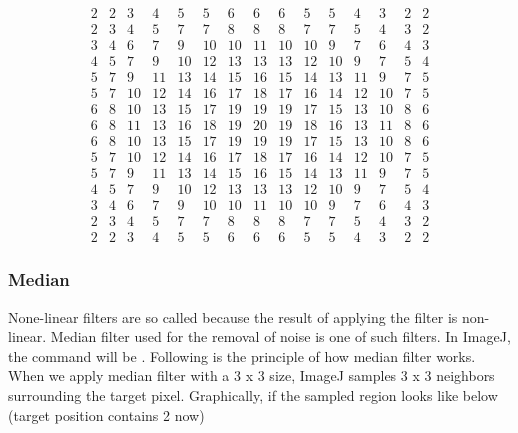 \setcounter{MaxMatrixCols}{16}
\[
\begin{matrix}
  2 & 2 & 3 & 4 & 5 & 5 & 6 & 6 & 6 & 5 & 5 & 4 & 3 & 2 & 2\\
  2 & 3 & 4 & 5 & 7 & 7 & 8 & 8 & 8 & 7 & 7 & 5 & 4 & 3 & 2\\
  3 & 4 & 6 & 7 & 9 & 10 & 10 & 11 & 10 & 10 & 9 & 7 & 6 & 4 & 3\\
  4 & 5 & 7 & 9 & 10 & 12 & 13 & 13 & 13 & 12 & 10 & 9 & 7 & 5 & 4\\
  5 & 7 & 9 & 11 & 13 & 14 & 15 & 16 & 15 & 14 & 13 & 11 & 9 & 7 & 5\\
  5 & 7 & 10 & 12 & 14 & 16 & 17 & 18 & 17 & 16 & 14 & 12 & 10 & 7 & 5\\
  6 & 8 & 10 & 13 & 15 & 17 & 19 & 19 & 19 & 17 & 15 & 13 & 10 & 8 & 6\\
  6 & 8 & 11 & 13 & 16 & 18 & 19 & 20 & 19 & 18 & 16 & 13 & 11 & 8 & 6\\
  6 & 8 & 10 & 13 & 15 & 17 & 19 & 19 & 19 & 17 & 15 & 13 & 10 & 8 & 6\\
  5 & 7 & 10 & 12 & 14 & 16 & 17 & 18 & 17 & 16 & 14 & 12 & 10 & 7 & 5\\
  5 & 7 & 9 & 11 & 13 & 14 & 15 & 16 & 15 & 14 & 13 & 11 & 9 & 7 & 5\\
  4 & 5 & 7 & 9 & 10 & 12 & 13 & 13 & 13 & 12 & 10 & 9 & 7 & 5 & 4\\
  3 & 4 & 6 & 7 & 9 & 10 & 10 & 11 & 10 & 10 & 9 & 7 & 6 & 4 & 3\\
  2 & 3 & 4 & 5 & 7 & 7 & 8 & 8 & 8 & 7 & 7 & 5 & 4 & 3 & 2\\
  2 & 2 & 3 & 4 & 5 & 5 & 6 & 6 & 6 & 5 & 5 & 4 & 3 & 2 & 2
 \end{matrix}
\]
\setcounter{MaxMatrixCols}{10}

\subsubsection{Median}
None-linear filters are so called because the result of applying the
filter is non-linear. Median filter used for the removal of noise is
one of such filters. In ImageJ, the command will be . Following is the
principle of how median filter works. When we apply median filter with
a 3 x 3 size, ImageJ samples 3 x 3 neighbors surrounding the target
pixel. Graphically, if the sampled region looks like below (target
position contains 2 now) 

